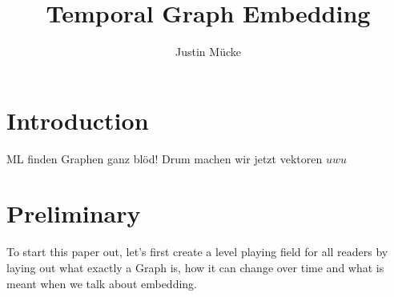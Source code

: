 \documentclass[sigconf]{acmart}
\begin{document}
\title{Temporal Graph Embedding}

\author{Justin Mücke}



\renewcommand{\shortauthors}{Justin Mücke}

\begin{abstract}
  
\end{abstract}





\maketitle

\section{Introduction}
ML finden Graphen ganz blöd! Drum machen wir jetzt vektoren \(uwu\)

\section{Preliminary}
To start this paper out, let's first create a level playing field for all readers by laying out what exactly a Graph is, 
how it can change over time and what is meant when we talk about embedding.
\end{document}
